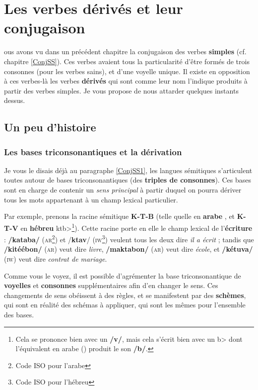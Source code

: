 \chapter{Les verbes dérivés et leur conjugaison}\label{DérivesVerbes}
ous avons vu dans un précédent chapitre la conjugaison des verbes \textbf{simples} (cf. chapitre \ref{ConjSS}). Ces verbes avaient tous la particularité d'être formés de trois consonnes (pour les verbes sains), et d'une voyelle unique. Il existe en opposition à ces verbes-là les verbes \textbf{dérivés} qui sont comme leur nom l'indique produits à partir des verbes simples. Je vous propose de nous attarder quelques instants dessus.

\section{Un peu d'histoire}
\subsection{Les bases triconsonantiques et la dérivation}
Je vous le disais déjà au paragraphe \ref{ConjSS1}, les langues sémitiques s'articulent toutes autour de bases triconsonantiques (des \textbf{triples de consonnes}). Ces bases sont en charge de contenir un \textit{sens principal} à partir duquel on pourra dériver tous les mots appartenant à un champ lexical particulier. 

Par exemple, prenons la racine sémitique \textbf{K-T-B} (telle quelle en \textbf{arabe} , et \textbf{K-T-V} en \textbf{hébreu} \<ktb>\footnote{Cela se prononce bien avec un \textbf{/v/}, mais cela s'écrit bien avec un \<b> dont l'équivalent en arabe () produit le son \textbf{/b/}.}). Cette racine porte en elle le champ lexical de l'\textbf{écriture} : \textbf{/kataba/} (\textsc{ar}\footnote{Code ISO pour l'arabe}) et /\textbf{ktav}/ (\textsc{iw}\footnote{Code ISO pour l'hébreu}) veulent tous les deux dire \textit{il a écrit} ; tandis que \textbf{/kitéébon/} (\textsc{ar}) veut dire \textit{livre}, \textbf{/maktabon/} (\textsc{ar}) veut dire \textit{école}, et \textbf{/kétuva/} (\textsc{iw}) veut dire \textit{contrat de mariage}.

Comme vous le voyez, il est possible d'agrémenter la base triconsonantique de \textbf{voyelles} et \textbf{consonnes} supplémentaires afin d'en changer le sens. Ces changements de sens obéissent à des règles, et se manifestent par des \textbf{schèmes}, qui sont en réalité des schémas à appliquer, qui sont les mêmes pour l'ensemble des bases. 

